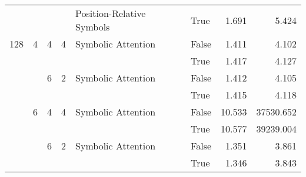 \begin{tabular}{llllllrr}
    &   &   &   & Position-Relative Symbols & True  &     1.691 &           5.424 \\
128 & 4 & 4 & 4 & Symbolic Attention & False &     1.411 &           4.102 \\
    &   &   &   &                    & True  &     1.417 &           4.127 \\
    &   & 6 & 2 & Symbolic Attention & False &     1.412 &           4.105 \\
    &   &   &   &                    & True  &     1.415 &           4.118 \\
    & 6 & 4 & 4 & Symbolic Attention & False &    10.533 &       37530.652 \\
    &   &   &   &                    & True  &    10.577 &       39239.004 \\
    &   & 6 & 2 & Symbolic Attention & False &     1.351 &           3.861 \\
    &   &   &   &                    & True  &     1.346 &           3.843 \\
\bottomrule
\end{tabular}
